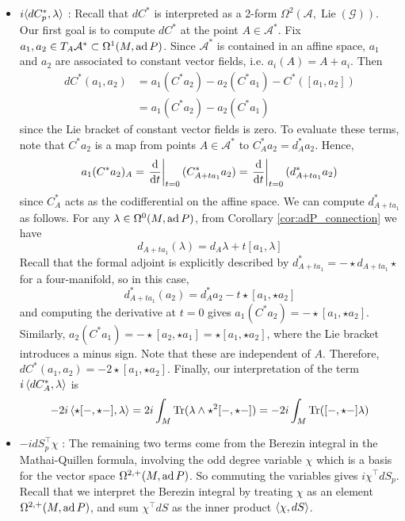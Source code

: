 \begin{itemize}[leftmargin=\parindent]
	\item  
$i\gen[*]{dC^*_p,\lambda}$ : Recall that $dC^*$ is interpreted as a 2-form 
$\Omega^2(\mathcal{A},\operatorname{Lie}(\mathcal{G}))$. Our first goal is to
compute $dC^*$ at the point $A \in \mathcal{A}^*$. 
Fix $a_1,a_2\in T_A \mathcal{A}^* \subset \Omega^1(M, \operatorname{ad} P)$. 
Since $\mathcal{A}^*$ is contained in an affine space, 
$a_1$ and $a_2$ are associated to constant vector fields, i.e.
$a_i(A)=A+a_i$. Then 
\begin{align*}
	dC^*(a_1,a_2) 
	&= a_1(C^*a_2) - a_2(C^*a_1) - C^*([a_1,a_2]) \\
	&= a_1(C^*a_2) - a_2(C^*a_1) 
\end{align*}
since the Lie bracket of constant vector fields is zero. To evaluate these
terms, note that $C^*a_2$ is a map from points $A\in \mathcal{A}^*$ to 
$C^*_Aa_2 = d^*_Aa_2$. Hence,
\begin{align*}
	a_1(C^*a_2)_A 
	= \odv{}{t}_{t=0}(C^*_{A+ta_1}a_2) 
	= \odv{}{t}_{t=0}(d^*_{A+ta_1}a_2) 
\end{align*}
since $C_A^*$ acts as the codifferential on the affine space. 
We can compute $d^*_{A+ta_1}$ as follows. 
For any $\lambda \in \Omega^0(M,\operatorname{ad} P)$, from Corollary \ref{cor:adP_connection}
we have
\[
	d_{A+ta_1}(\lambda) = d_A\lambda + t[a_1,\lambda]
\] 
Recall that the formal adjoint is explicitly described by 
$d^*_{A+ta_1} = -\star d_{A+ta_1} \star$ for a four-manifold, so in this case,
\[
	d^*_{A+ta_1}(a_2) = d^*_A a_2 - t \star [a_1,\star a_2]
\] 
and computing the derivative at $t=0$ gives
$a_1(C^*a_2) = -\star [a_1, \star a_2]$. Similarly, 
$a_2(C^*a_1) = -\star [a_2, \star a_1] = \star [a_1, \star a_2]$, 
where the Lie bracket introduces a minus sign. 
Note that these are independent of $A$. 
Therefore, $dC^*(a_1,a_2) = -2 \star [a_1,\star a_2]$.
Finally, our interpretation of the term $i\gen{dC^*_A,\lambda}$ is 
\[
-2i \gen{\star[-,\star -], \lambda}
= 2i \int_M \Tr(\lambda \wedge \star^2[-,\star -] )
= -2i \int_M \Tr( [-,\star -]\lambda )
\] 

	\item 
$-idS^\intercal_p \chi$ : The remaining two terms come from the Berezin integral
in the Mathai-Quillen formula, involving the odd degree
variable $\chi$ which is a basis for the vector space $\Omega^{2,+}(M,\operatorname{ad} P)$.
So commuting the variables gives $i \chi^{\intercal} dS_p$.
Recall that we interpret the Berezin integral by treating $\chi$ as an element 
$\Omega^{2,+}(M,\operatorname{ad} P)$, and 
sum $\chi^\intercal dS$ as the inner product $\gen{\chi,dS}$.


\end{itemize}
